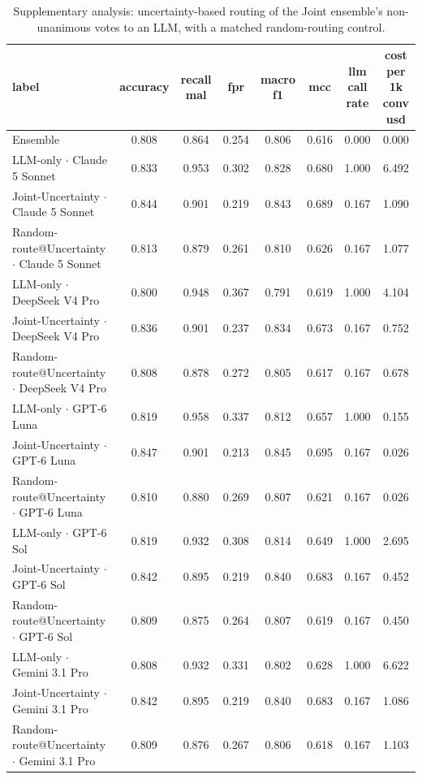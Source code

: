 \begin{table}[htbp]
\centering
\caption{Supplementary analysis: uncertainty-based routing of the Joint ensemble's non-unanimous votes to an LLM, with a matched random-routing control.}
\label{tab:tableS1_extra_uncertainty_routing}
\small
\begin{tabular}{lccccccc}
\toprule
\textbf{label} & \textbf{accuracy} & \textbf{recall mal} & \textbf{fpr} & \textbf{macro f1} & \textbf{mcc} & \textbf{llm call rate} & \textbf{cost per 1k conv usd} \\
\midrule
Ensemble & 0.808 & 0.864 & 0.254 & 0.806 & 0.616 & 0.000 & 0.000 \\
LLM-only $\cdot$ Claude 5 Sonnet & 0.833 & 0.953 & 0.302 & 0.828 & 0.680 & 1.000 & 6.492 \\
Joint-Uncertainty $\cdot$ Claude 5 Sonnet & 0.844 & 0.901 & 0.219 & 0.843 & 0.689 & 0.167 & 1.090 \\
Random-route@Uncertainty $\cdot$ Claude 5 Sonnet & 0.813 & 0.879 & 0.261 & 0.810 & 0.626 & 0.167 & 1.077 \\
LLM-only $\cdot$ DeepSeek V4 Pro & 0.800 & 0.948 & 0.367 & 0.791 & 0.619 & 1.000 & 4.104 \\
Joint-Uncertainty $\cdot$ DeepSeek V4 Pro & 0.836 & 0.901 & 0.237 & 0.834 & 0.673 & 0.167 & 0.752 \\
Random-route@Uncertainty $\cdot$ DeepSeek V4 Pro & 0.808 & 0.878 & 0.272 & 0.805 & 0.617 & 0.167 & 0.678 \\
LLM-only $\cdot$ GPT-6 Luna & 0.819 & 0.958 & 0.337 & 0.812 & 0.657 & 1.000 & 0.155 \\
Joint-Uncertainty $\cdot$ GPT-6 Luna & 0.847 & 0.901 & 0.213 & 0.845 & 0.695 & 0.167 & 0.026 \\
Random-route@Uncertainty $\cdot$ GPT-6 Luna & 0.810 & 0.880 & 0.269 & 0.807 & 0.621 & 0.167 & 0.026 \\
LLM-only $\cdot$ GPT-6 Sol & 0.819 & 0.932 & 0.308 & 0.814 & 0.649 & 1.000 & 2.695 \\
Joint-Uncertainty $\cdot$ GPT-6 Sol & 0.842 & 0.895 & 0.219 & 0.840 & 0.683 & 0.167 & 0.452 \\
Random-route@Uncertainty $\cdot$ GPT-6 Sol & 0.809 & 0.875 & 0.264 & 0.807 & 0.619 & 0.167 & 0.450 \\
LLM-only $\cdot$ Gemini 3.1 Pro & 0.808 & 0.932 & 0.331 & 0.802 & 0.628 & 1.000 & 6.622 \\
Joint-Uncertainty $\cdot$ Gemini 3.1 Pro & 0.842 & 0.895 & 0.219 & 0.840 & 0.683 & 0.167 & 1.086 \\
Random-route@Uncertainty $\cdot$ Gemini 3.1 Pro & 0.809 & 0.876 & 0.267 & 0.806 & 0.618 & 0.167 & 1.103 \\

\end{tabular}
\end{table}
